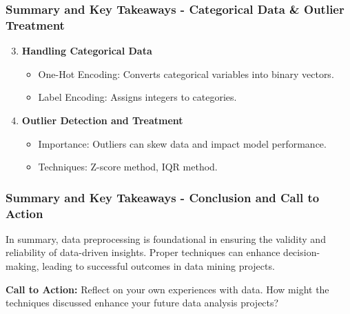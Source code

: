 \documentclass[aspectratio=169]{beamer}
\begin{document}
\begin{frame}[fragile]
    \frametitle{Summary and Key Takeaways - Categorical Data & Outlier Treatment}
    \begin{enumerate}
        \setcounter{enumi}{2}
        \item \textbf{Handling Categorical Data}
        \begin{itemize}
            \item One-Hot Encoding: Converts categorical variables into binary vectors.
            \item Label Encoding: Assigns integers to categories.
        \end{itemize}

        \item \textbf{Outlier Detection and Treatment}
        \begin{itemize}
            \item Importance: Outliers can skew data and impact model performance.
            \item Techniques: Z-score method, IQR method.
        \end{itemize}
    \end{enumerate}
\end{frame}

\begin{frame}[fragile]
    \frametitle{Summary and Key Takeaways - Conclusion and Call to Action}
    In summary, data preprocessing is foundational in ensuring the validity and reliability of data-driven insights. Proper techniques can enhance decision-making, leading to successful outcomes in data mining projects.
    
    \textbf{Call to Action:} Reflect on your own experiences with data. How might the techniques discussed enhance your future data analysis projects?
\end{frame}
\end{document}
